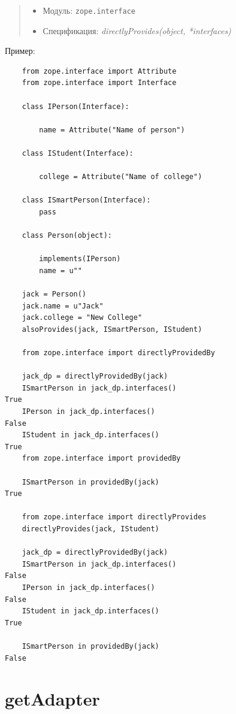 \documentclass[a4paper,openany,twoside,draft]{book}
\providecommand*{\DUroletitlereference}[1]{\textsl{#1}}
\begin{document}
\begin{quote}

\begin{itemize}

\item Модуль: \texttt{zope.interface}

\item Спецификация: \DUroletitlereference{directlyProvides(object, *interfaces)}

\end{itemize}

\end{quote}

Пример:

\begin{verbatim}
    from zope.interface import Attribute
    from zope.interface import Interface

    class IPerson(Interface):

        name = Attribute("Name of person")

    class IStudent(Interface):

        college = Attribute("Name of college")

    class ISmartPerson(Interface):
        pass

    class Person(object):

        implements(IPerson)
        name = u""

    jack = Person()
    jack.name = u"Jack"
    jack.college = "New College"
    alsoProvides(jack, ISmartPerson, IStudent)

    from zope.interface import directlyProvidedBy

    jack_dp = directlyProvidedBy(jack)
    ISmartPerson in jack_dp.interfaces()
True
    IPerson in jack_dp.interfaces()
False
    IStudent in jack_dp.interfaces()
True
    from zope.interface import providedBy

    ISmartPerson in providedBy(jack)
True

    from zope.interface import directlyProvides
    directlyProvides(jack, IStudent)

    jack_dp = directlyProvidedBy(jack)
    ISmartPerson in jack_dp.interfaces()
False
    IPerson in jack_dp.interfaces()
False
    IStudent in jack_dp.interfaces()
True

    ISmartPerson in providedBy(jack)
False
\end{verbatim}


\section*{getAdapter%
  \label{getadapter}%
}
\end{document}
